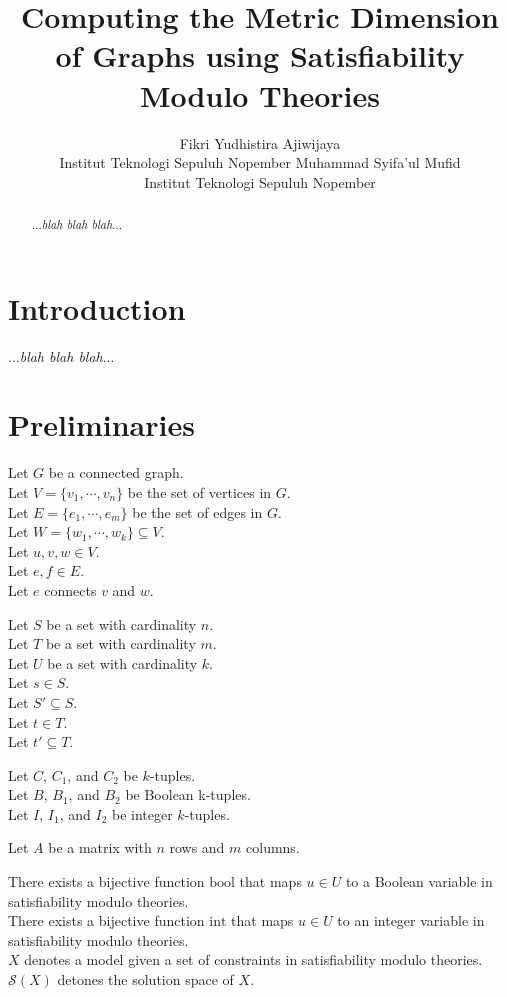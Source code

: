 \documentclass{article}
\title{Computing the Metric Dimension of Graphs using Satisfiability Modulo Theories}
\author{
	Fikri Yudhistira Ajiwijaya \\
	Institut Teknologi Sepuluh Nopember
	\And
	Muhammad Syifa'ul Mufid \\
	Institut Teknologi Sepuluh Nopember
}
\begin{document}
\maketitle

\begin{abstract}
	...\textit{blah blah blah}...
\end{abstract}

\section{Introduction}

...\textit{blah blah blah}...

\section{Preliminaries}

Let \(G\) be a connected graph. \\
Let \(V = \{v_1, \cdots, v_n\}\) be the set of vertices in \(G\). \\
Let \(E = \{e_1, \cdots, e_m\}\) be the set of edges in \(G\). \\
Let \(W = \{w_1, \cdots, w_k\} \subseteq V\). \\
Let \(u, v, w \in V\). \\
Let \(e, f \in E\). \\
Let \(e\) connects \(v\) and \(w\).

Let \(S\) be a set with cardinality \(n\). \\
Let \(T\) be a set with cardinality \(m\). \\
Let \(U\) be a set with cardinality \(k\). \\
Let \(s \in S\). \\
Let \(S' \subseteq S\). \\
Let \(t \in T\). \\
Let \(t' \subseteq T\).

Let \(C\), \(C_1\), and \(C_2\) be \(k\)-tuples. \\
Let \(B\), \(B_1\), and \(B_2\) be Boolean k-tuples. \\
Let \(I\), \(I_1\), and \(I_2\) be integer \(k\)-tuples.

Let \(A\) be a matrix with \(n\) rows and \(m\) columns.

\clearpage

There exists a bijective function \(\mathrm{bool}\) that maps \(u \in U\) to a Boolean variable in satisfiability modulo theories. \\
There exists a bijective function \(\mathrm{int}\) that maps \(u \in U\) to an integer variable in satisfiability modulo theories. \\
\(X\) denotes a model given a set of constraints in satisfiability modulo theories. \\
\(\mathcal{S}(X)\) detones the solution space of \(X\).
\end{document}
